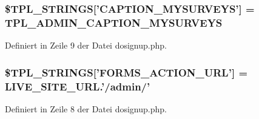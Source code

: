 \subsubsection{\setlength{\rightskip}{0pt plus 5cm}\$TPL\_\-STRINGS['CAPTION\_\-MYSURVEYS'] = {\bf TPL\_\-ADMIN\_\-CAPTION\_\-MYSURVEYS}}\label{dosignup_8php_0afbd0b277e574e9939eea9a136ef999}




Definiert in Zeile 9 der Datei dosignup.php.
\subsubsection{\setlength{\rightskip}{0pt plus 5cm}\$TPL\_\-STRINGS['FORMS\_\-ACTION\_\-URL'] = LIVE\_\-SITE\_\-URL.'/admin/'}\label{dosignup_8php_823c4b552b4a5b8af4c5197799581922}




Definiert in Zeile 8 der Datei dosignup.php.